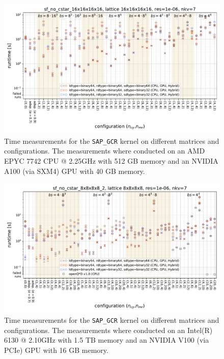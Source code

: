 \documentclass{article}
\theoremstyle{plain} %
\theoremstyle{convention} %
\theoremstyle{remark} %
\def\code#1{\texttt{#1}}
\numberwithin{equation}{section}
\begin{document}
\begin{figure}[h]
    \centering
    \includegraphics[width=1.0\textwidth]{plots/sap_gcr_sf_no_cstar_16x16x16x16_lattice_16x16x16x16_res=1e-06_nkv=7}
    \caption{Time measurements for the \code{SAP\_GCR} kernel on different matrices and configurations. The measurements where conducted on an AMD EPYC 7742 CPU @ 2.25GHz with 512 GB memory and an NVIDIA A100 (via SXM4) GPU with 40 GB memory.}
    \label{fig:sap_gcr3}
    \label{fig:sap_gcr_sf_16x16x16x16}
\end{figure}

\begin{figure}[h]
    \centering
    \includegraphics[width=1.0\textwidth]{plots/sap_gcr_sf_no_cstar_8x8x8x8_2_lattice_8x8x8x8_res=1e-06_nkv=7}
    \caption{Time measurements for the \code{SAP\_GCR} kernel on different matrices and configurations. The measurements where conducted on an Intel(R) 6130 @ 2.10GHz with 1.5 TB memory and an NVIDIA V100 (via PCIe) GPU with 16 GB memory.}
    \label{fig:sap_gcr4}
    \label{fig:sap_gcr_end}
    \label{fig:sap_gcr_sf_8x8x8x8_2}
\end{figure}
\end{document}
